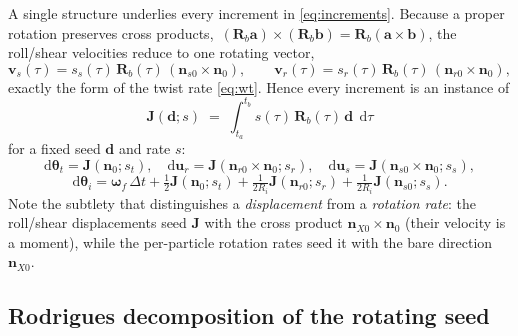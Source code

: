 \documentclass[11pt]{article}
\newcommand{\dd}{\,\mathrm{d}}
\newcommand{\Rb}{\mathbf{R}_b}
\newcommand{\bwf}{\boldsymbol{\omega}_f}
\newcommand{\Dt}{\Delta t}
\begin{document}
A single structure underlies every increment in \eqref{eq:increments}. Because a proper
rotation preserves cross products, $\,(\Rb\mathbf{a})\times(\Rb\mathbf{b})=\Rb(\mathbf{a}\times\mathbf{b})$,
the roll/shear velocities reduce to one rotating vector,
\begin{equation}
  \mathbf{v}_s(\tau)=s_s(\tau)\,\Rb(\tau)\,(\mathbf{n}_{s0}\times\mathbf{n}_0),
  \qquad
  \mathbf{v}_r(\tau)=s_r(\tau)\,\Rb(\tau)\,(\mathbf{n}_{r0}\times\mathbf{n}_0),
\end{equation}
exactly the form of the twist rate \eqref{eq:wt}. Hence every increment is an instance of
\begin{equation}
  \boxed{\;\;
  \mathbf{J}(\mathbf{d};s)\;=\;\int_{t_a}^{t_b} s(\tau)\,\Rb(\tau)\,\mathbf{d}\;\dd\tau
  \;\;}
  \label{eq:J}
\end{equation}
for a fixed seed $\mathbf{d}$ and rate $s$:
\begin{equation}
  \mathrm{d}\boldsymbol{\theta}_t=\mathbf{J}(\mathbf{n}_0;s_t),\quad
  \mathrm{d}\mathbf{u}_r=\mathbf{J}(\mathbf{n}_{r0}\times\mathbf{n}_0;s_r),\quad
  \mathrm{d}\mathbf{u}_s=\mathbf{J}(\mathbf{n}_{s0}\times\mathbf{n}_0;s_s),
  \label{eq:incr-as-J}
\end{equation}
\begin{equation}
  \mathrm{d}\boldsymbol{\theta}_i
   = \bwf\,\Dt + \tfrac12\mathbf{J}(\mathbf{n}_0;s_t)
   + \tfrac{1}{2R_i}\mathbf{J}(\mathbf{n}_{r0};s_r)
   + \tfrac{1}{2R_i}\mathbf{J}(\mathbf{n}_{s0};s_s).
  \label{eq:dthi-as-J}
\end{equation}
Note the subtlety that distinguishes a \emph{displacement} from a \emph{rotation rate}:
the roll/shear displacements seed $\mathbf{J}$ with the cross product
$\mathbf{n}_{X0}\times\mathbf{n}_0$ (their velocity is a moment), while the per-particle
rotation rates seed it with the bare direction $\mathbf{n}_{X0}$.

\subsection{Rodrigues decomposition of the rotating seed}
\end{document}

